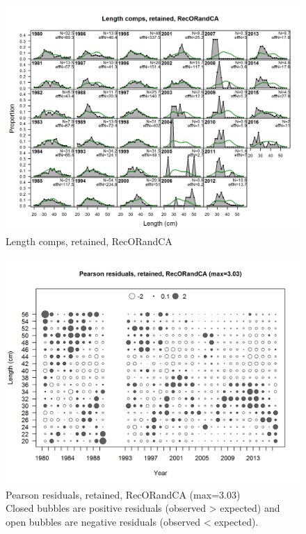 \documentclass[12pt,]{article}
\begin{document}
\begin{figure}[htbp]
\centering
\includegraphics{./r4ss/plots_mod1/comp_lenfit_flt3mkt2.png}
\caption{Length comps, retained, RecORandCA
\label{fig:mod1_14_comp_lenfit_flt3mkt2}}
\end{figure}

\begin{figure}[htbp]
\centering
\includegraphics{./r4ss/plots_mod1/comp_lenfit_residsflt3mkt2.png}
\caption{Pearson residuals, retained, RecORandCA (max=3.03)\\
Closed bubbles are positive residuals (observed \textgreater{} expected)
and open bubbles are negative residuals (observed \textless{} expected).
\label{fig:mod1_15_comp_lenfit_residsflt3mkt2}}
\end{figure}
\end{document}
